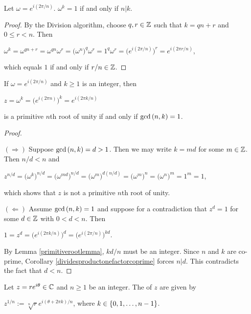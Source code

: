 \documentclass[11pt,fleqn,dvipsnames,usenames]{article}
\begin{document}
\begin{lemma}\label{primitiverootlemma}
Let $\omega = e^{i(2\pi/n)}$.  $\omega^{k} = 1$ if and only if $n|k$.
\end{lemma}
%
\begin{proof}
By the Division algorithm, choose $q,r\in\mathbb{Z}$ such that $k = qn + r$ and $0\leq r < n$.  Then
\begin{center}
$\omega^{k} = \omega^{qn + r} = \omega^{qn}\omega^{r} = \big(\omega^{n})^{q}\omega^{r} = 1^{q}\omega^{r} = \big(e^{i(2\pi/n)}\big)^{r} = e^{i(2\pi r/n)}$,
\end{center}
which equals $1$ if and only if $r/n\in\mathbb{Z}$.
\end{proof}
%
\begin{theorem}
If $\omega = e^{i(2\pi/n)}$ and $k\geq 1$ is an integer, then
\begin{center}
$z = \omega^{k} = \big(e^{i(2\pi n)}\big)^{k} = e^{i(2\pi k/n)}$
\end{center}
is a primitive $n$th root of unity if and only if $\text{gcd}\left(n,k\right) = 1$.
\end{theorem}
%
\begin{proof}~

$(\Rightarrow)$ Suppose $\text{gcd}\left(n,k\right) = d > 1$.  Then we may write $k = md$ for some $m\in\mathbb{Z}$.  Then $n/d < n$ and
\begin{center}
$z^{n/d} = \big(\omega^{k}\big)^{n/d} = \big(\omega^{md}\big)^{n/d} =  \big(\omega^{m}\big)^{d(n/d)} = \big(\omega^{m}\big)^{n} = \big(\omega^{n}\big)^{m} = 1^{m} = 1$,
\end{center}
which shows that $z$ is not a primitive $n$th root of unity.
\vsp

$(\Leftarrow)$ Assume $\text{gcd}\left(n,k\right) = 1$ and suppose for a contradiction that $z^{d} = 1$ for some $d\in\mathbb{Z}$ with $0 < d < n$.  Then
\begin{center}
$1 = z^{d} = \big(e^{i(2\pi k/n)}\big)^{d} = \big(e^{i(2\pi/n)}\big)^{kd}$.
\end{center}
By Lemma \ref{primitiverootlemma}, $kd/n$ must be an integer.  Since $n$ and $k$ are co-prime, Corollary \ref{dividesproductonefactorcoprime} forces $n|d$.  This contradicts the fact that $d<n$.
\end{proof}
%
\begin{definition}
Let $z = re^{i\theta}\in \mathbb{C}$ and $n\geq 1$ be an integer. The  of $z$ are given by
\begin{center}
$z^{1/n} := \sqrt[n]{r}e^{i(\theta + 2\pi k)/n}$, where $k\in\left\{0, 1, \ldots, n -1\right\}$.
\end{center}
\end{definition}
\end{document}
